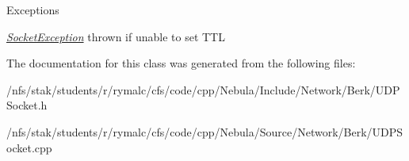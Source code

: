 \begin{DoxyExceptions}{Exceptions}
\item[{\em \hyperlink{classSocketException}{SocketException}}]thrown if unable to set TTL \end{DoxyExceptions}


The documentation for this class was generated from the following files:\begin{DoxyCompactItemize}
\item 
/nfs/stak/students/r/rymalc/cfs/code/cpp/Nebula/Include/Network/Berk/UDPSocket.h\item 
/nfs/stak/students/r/rymalc/cfs/code/cpp/Nebula/Source/Network/Berk/UDPSocket.cpp\end{DoxyCompactItemize}
